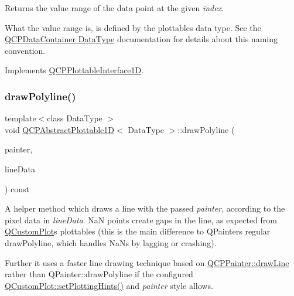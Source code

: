 Returns the value range of the data point at the given {\itshape index}.

What the value range is, is defined by the plottable\textquotesingle{}s data type. See the \hyperlink{class_q_c_p_data_container_qcpdatacontainer-datatype}{Q\+C\+P\+Data\+Container Data\+Type} documentation for details about this naming convention. 

Implements \hyperlink{class_q_c_p_plottable_interface1_d_a9ca7fcf14d885a200879768679b19be9}{Q\+C\+P\+Plottable\+Interface1D}.

\mbox{\label{class_q_c_p_abstract_plottable1_d_a7adc6c3cccebb5341f11e0c2b7d54206}} 
\subsubsection{\texorpdfstring{draw\+Polyline()}{drawPolyline()}}
{\footnotesize\ttfamily template$<$class Data\+Type $>$ \\
void \hyperlink{class_q_c_p_abstract_plottable1_d}{Q\+C\+P\+Abstract\+Plottable1D}$<$ Data\+Type $>$\+::draw\+Polyline (\begin{DoxyParamCaption}\item[{\hyperlink{class_q_c_p_painter}{Q\+C\+P\+Painter} $\ast$}]{painter,  }\item[{const Q\+Vector$<$ Q\+PointF $>$ \&}]{line\+Data }\end{DoxyParamCaption}) const\hspace{0.3cm}{\ttfamily [protected]}}

A helper method which draws a line with the passed {\itshape painter}, according to the pixel data in {\itshape line\+Data}. NaN points create gaps in the line, as expected from \hyperlink{class_q_custom_plot}{Q\+Custom\+Plot}\textquotesingle{}s plottables (this is the main difference to Q\+Painter\textquotesingle{}s regular draw\+Polyline, which handles Na\+Ns by lagging or crashing).

Further it uses a faster line drawing technique based on \hyperlink{class_q_c_p_painter_a0b4b1b9bd495e182c731774dc800e6e0}{Q\+C\+P\+Painter\+::draw\+Line} rather than {\ttfamily Q\+Painter\+::draw\+Polyline} if the configured \hyperlink{class_q_custom_plot_a94a33cbdadbbac5934843508bcfc210d}{Q\+Custom\+Plot\+::set\+Plotting\+Hints()} and {\itshape painter} style allows. \mbox{\label{class_q_c_p_abstract_plottable1_d_ad0b46d25cde3d035b180fb8f10c056e6}} 

